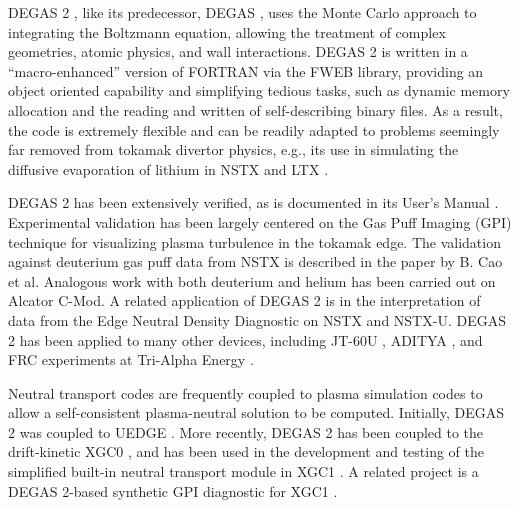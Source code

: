 \documentclass[11pt]{article}
\begin{document}
DEGAS 2 \cite{Stot94}, like its predecessor, DEGAS \cite{Heif82}, uses 
the Monte Carlo approach to integrating the Boltzmann
equation, allowing the treatment of complex geometries, atomic
physics, and wall interactions.
DEGAS 2 is written in a ``macro-enhanced''
version of FORTRAN via the FWEB library, providing an object oriented capability
and simplifying tedious tasks, such as dynamic memory allocation and the reading
and written of self-describing binary files.  As a result, the code is
extremely flexible and can be readily adapted to problems seemingly far removed
from tokamak divertor physics, e.g., its use in simulating
the diffusive evaporation of lithium in NSTX \cite{Stot2011} and LTX \cite{Schm2013}.

DEGAS 2 has been extensively verified, as is documented in its 
User's Manual \cite{D2UM}.
Experimental validation has been largely centered on the Gas Puff Imaging (GPI)
technique for visualizing plasma turbulence in the tokamak edge.
The validation against
deuterium gas puff data from NSTX is described in the paper by 
B. Cao et al. \cite{Cao2013}  
Analogous work with both deuterium and helium has been carried out on
Alcator C-Mod.  A related application of DEGAS 2 is in the interpretation of data from
the Edge Neutral Density Diagnostic on NSTX \cite{Stot2015} and NSTX-U.  DEGAS 2
has been applied to many other devices, including JT-60U \cite{Take2002},
ADITYA \cite{Dey2017}, and FRC experiments at Tri-Alpha Energy \cite{Gran2018}.

Neutral transport codes are frequently coupled to plasma simulation
codes to allow a self-consistent plasma-neutral solution to be 
computed.
Initially,
DEGAS 2 was coupled to UEDGE \cite{Stot2000}.
More
recently, DEGAS 2 has been coupled to the 
drift-kinetic XGC0 \cite{Stot2013}, and has been
used in the development and testing of the simplified built-in neutral transport
module in XGC1 \cite{Stot2017}.   A related project is a DEGAS 2-based synthetic
GPI diagnostic for XGC1 \cite{Stot2019}.
\end{document}

